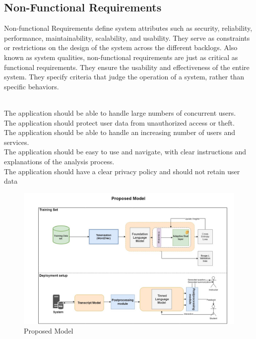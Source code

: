 \subsection{Non-Functional Requirements}
Non-functional Requirements define system attributes such as security,
reliability, performance, maintainability, scalability, and usability. They serve as
constraints or restrictions on the design of the system across the different backlogs.
Also known as system qualities, non-functional requirements are just as critical as
functional requirements. They ensure the usability and effectiveness of the entire
system. They specify criteria that judge the operation of a system, rather than specific
behaviors.

\begin{itemize}
     \vspace{0.2cm} \\
        The application should be able to handle large numbers of concurrent users.  
     \vspace{0.2cm} \\
        The application should protect user data from
        unauthorized access or theft.
     \vspace{0.2cm} \\
        The application should be able to handle an increasing number of users and services.
     \vspace{0.2cm} \\
        The application should be easy to use and navigate, with
        clear instructions and explanations of the analysis process.
     \vspace{0.2cm} \\
        The application should have a clear privacy policy and
        should not retain user data
    
\end{itemize}

\begin{figure}[h]
	\centering
	\includegraphics[max height=\textheight,max width=\textwidth]{figures/proposal-model.jpeg}
	\caption{Proposed Model}
\end{figure}

